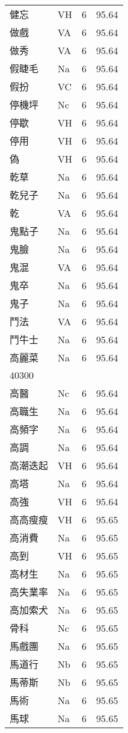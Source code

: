 \documentclass[twocolumn]{book}
\begin{document}
\begin{supertabular}{llrr}
健忘 & VH & 6 &  95.64\\
做戲 & VA & 6 &  95.64\\
做秀 & VA & 6 &  95.64\\
假睫毛 & Na & 6 &  95.64\\
假扮 & VC & 6 &  95.64\\
停機坪 & Nc & 6 &  95.64\\
停歇 & VH & 6 &  95.64\\
停用 & VH & 6 &  95.64\\
偽 & VH & 6 &  95.64\\
乾草 & Na & 6 &  95.64\\
乾兒子 & Na & 6 &  95.64\\
乾 & VA & 6 &  95.64\\
鬼點子 & Na & 6 &  95.64\\
鬼臉 & Na & 6 &  95.64\\
鬼混 & VA & 6 &  95.64\\
鬼卒 & Na & 6 &  95.64\\
鬼子 & Na & 6 &  95.64\\
鬥法 & VA & 6 &  95.64\\
鬥牛士 & Na & 6 &  95.64\\
高麗菜 & Na & 6 &  95.64\\
40300\\
高醫 & Nc & 6 &  95.64\\
高職生 & Na & 6 &  95.64\\
高頻字 & Na & 6 &  95.64\\
高調 & Na & 6 &  95.64\\
高潮迭起 & VH & 6 &  95.64\\
高塔 & Na & 6 &  95.64\\
高強 & VH & 6 &  95.64\\
高高瘦瘦 & VH & 6 &  95.65\\
高消費 & Na & 6 &  95.65\\
高到 & VH & 6 &  95.65\\
高材生 & Na & 6 &  95.65\\
高失業率 & Na & 6 &  95.65\\
高加索犬 & Na & 6 &  95.65\\
骨科 & Nc & 6 &  95.65\\
馬戲團 & Na & 6 &  95.65\\
馬道行 & Nb & 6 &  95.65\\
馬蒂斯 & Nb & 6 &  95.65\\
馬術 & Na & 6 &  95.65\\
馬球 & Na & 6 &  95.65\\

\end{supertabular}
\end{document}
